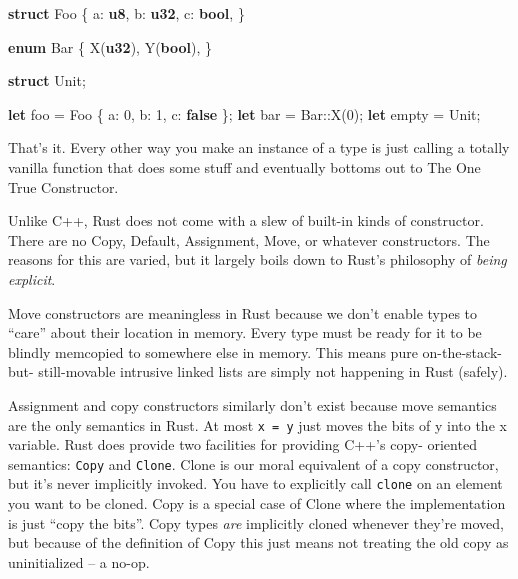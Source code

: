 \documentclass[a4paper,]{book}
\newenvironment{Shaded}{\begin{snugshade}}{\end{snugshade}}
\newcommand{\KeywordTok}[1]{\textcolor[rgb]{0.13,0.29,0.53}{\textbf{{#1}}}}
\newcommand{\DecValTok}[1]{\textcolor[rgb]{0.00,0.00,0.81}{{#1}}}
\newcommand{\NormalTok}[1]{{#1}}
\begin{document}
\begin{Shaded}
\begin{Highlighting}[]
\KeywordTok{struct} \NormalTok{Foo \{}
    \NormalTok{a: }\KeywordTok{u8}\NormalTok{,}
    \NormalTok{b: }\KeywordTok{u32}\NormalTok{,}
    \NormalTok{c: }\KeywordTok{bool}\NormalTok{,}
\NormalTok{\}}

\KeywordTok{enum} \NormalTok{Bar \{}
    \NormalTok{X(}\KeywordTok{u32}\NormalTok{),}
    \NormalTok{Y(}\KeywordTok{bool}\NormalTok{),}
\NormalTok{\}}

\KeywordTok{struct} \NormalTok{Unit;}

\KeywordTok{let} \NormalTok{foo = Foo \{ a: }\DecValTok{0}\NormalTok{, b: }\DecValTok{1}\NormalTok{, c: }\KeywordTok{false} \NormalTok{\};}
\KeywordTok{let} \NormalTok{bar = Bar::X(}\DecValTok{0}\NormalTok{);}
\KeywordTok{let} \NormalTok{empty = Unit;}
\end{Highlighting}
\end{Shaded}

That's it. Every other way you make an instance of a type is just
calling a totally vanilla function that does some stuff and eventually
bottoms out to The One True Constructor.

Unlike C++, Rust does not come with a slew of built-in kinds of
constructor. There are no Copy, Default, Assignment, Move, or whatever
constructors. The reasons for this are varied, but it largely boils down
to Rust's philosophy of \emph{being explicit}.

Move constructors are meaningless in Rust because we don't enable types
to ``care'' about their location in memory. Every type must be ready for
it to be blindly memcopied to somewhere else in memory. This means pure
on-the-stack-but- still-movable intrusive linked lists are simply not
happening in Rust (safely).

Assignment and copy constructors similarly don't exist because move
semantics are the only semantics in Rust. At most \texttt{x\ =\ y} just
moves the bits of y into the x variable. Rust does provide two
facilities for providing C++'s copy- oriented semantics: \texttt{Copy}
and \texttt{Clone}. Clone is our moral equivalent of a copy constructor,
but it's never implicitly invoked. You have to explicitly call
\texttt{clone} on an element you want to be cloned. Copy is a special
case of Clone where the implementation is just ``copy the bits''. Copy
types \emph{are} implicitly cloned whenever they're moved, but because
of the definition of Copy this just means not treating the old copy as
uninitialized -- a no-op.
\end{document}
